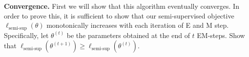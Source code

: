 \item{}
\textbf{Convergence.}
First we will show that this algorithm eventually converges. In order to prove this, it is sufficient to show that our semi-supervised objective $\ell_\text{semi-sup}(\theta)$ monotonically increases with each iteration of E and M step. Specifically, let $\theta^{(t)}$ be the parameters obtained at the end of $t$ EM-steps. Show that $\ell_\text{semi-sup}(\theta^{(t+1)}) \ge \ell_\text{semi-sup}(\theta^{(t)})$.



